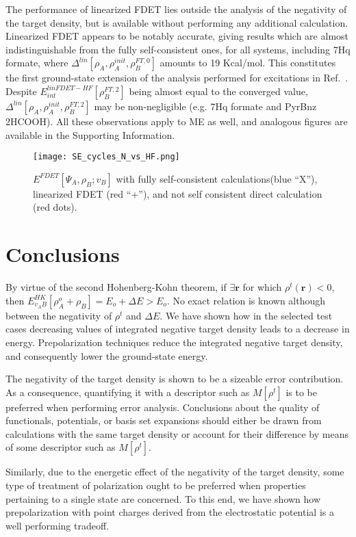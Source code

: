 \documentclass[journal=jctcce,manuscript=article, layout=twocolumn]{achemso}
\begin{document}
The performance of linearized FDET lies outside the analysis of the negativity of the target density, but is available without performing any additional calculation.
Linearized FDET appears to be notably accurate, giving results which are almost indistinguishable from the fully self-consistent ones, for all systems, including 7Hq formate, where $\Delta^{lin}[\rho_A,\rho_A^{init},\rho_B^{FT,0}]$ amounts to 19 Kcal/mol. This constitutes the first ground-state extension of the analysis performed for excitations in Ref.~.
Despite $E^{linFDET-HF}_{int}[\rho_B^{FT,2}]$ being almost equal to the converged value, $\Delta^{lin}[\rho_A,\rho_A^{init},\rho_B^{FT,2}]$ may be non-negligible (e.g. 7Hq formate and PyrBnz 2HCOOH). All these observations apply to ME as well, and analogous figures are available in the Supporting Information.

\begin{figure}[H]
\centering
\texttt{[image: SE\_cycles\_N\_vs\_HF.png]}
\caption{$E^{FDET}[\Psi_A,\rho_B; v_B]$ with fully self-consistent calculations(blue ``X''), linearized FDET (red ``+''), and not self consistent direct calculation (red dots).}
\label{fig:N_vs_HF_SE}
\end{figure}

\section{Conclusions}
By virtue of the second Hohenberg-Kohn theorem, if $\exists \mathbf{r}$ for which $\rho^t(\mathbf{r}) < 0$, then $E^{HK}_{v_AB}[\rho_A^o + \rho_B] = E_o + \Delta E > E_o$.
No exact relation is known although between the negativity of $\rho^t$ and $\Delta E$.
We have shown how in the selected test cases decreasing values of integrated negative target density leads to a decrease in energy.
Prepolarization techniques reduce the integrated negative target density, and consequently lower the ground-state energy.

The negativity of the target density is shown to be a sizeable error contribution. As a consequence, quantifying it with a descriptor such as $M[\rho^t]$ is to be preferred when performing error analysis. Conclusions about the quality of functionals, potentials, or basis set expansions should either be drawn from calculations with the same target density or account for their difference by means of some descriptor such as $M[\rho^t]$.

Similarly, due to the energetic effect of the negativity of the target density, some type of treatment of polarization ought to be preferred when properties pertaining to a single state are concerned.
To this end, we have shown how prepolarization with point charges derived from the electrostatic potential is a well performing tradeoff.
\end{document}
